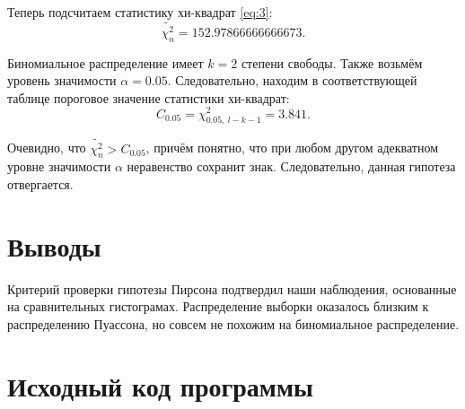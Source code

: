 \documentclass[12pt]{article}
\begin{document}
Теперь подсчитаем статистику хи-квадрат \eqref{eq:3}:
$$\widetilde{\chi^2_n} = 152.97866666666673.$$

Биномиальное распределение имеет $k = 2$ степени свободы. Также
возьмём уровень значимости $\alpha = 0.05$. Следовательно,
находим в соответствующей таблице пороговое значение статистики хи-квадрат:
$$C_{0.05} = \chi^2_{0.05,\  l - k - 1} = 3.841.$$

Очевидно, что $\widetilde{\chi^2_n} > C_{0.05}$, причём понятно, что при любом другом
адекватном уровне значимости $\alpha$ неравенство сохранит знак. Следовательно,
данная гипотеза отвергается.
\section{Выводы}

Критерий проверки гипотезы Пирсона подтвердил наши наблюдения, основанные на
сравнительных гистограмах. Распределение выборки оказалось близким к распределению
Пуассона, но совсем не похожим на биномиальное распределение.
\section{Исходный код программы}

\end{document}
